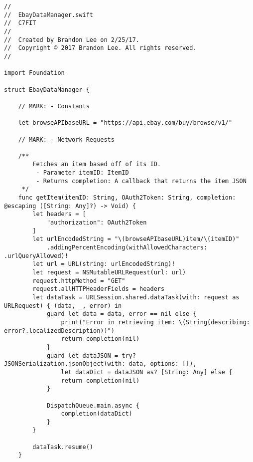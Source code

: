 \begin{verbatim}
//
//  EbayDataManager.swift
//  C7FIT
//
//  Created by Brandon Lee on 2/25/17.
//  Copyright © 2017 Brandon Lee. All rights reserved.
//

import Foundation

struct EbayDataManager {

    // MARK: - Constants

    let browseAPIbaseURL = "https://api.ebay.com/buy/browse/v1/"

    // MARK: - Network Requests

    /**
        Fetches an item based off of its ID.
         - Parameter itemID: ItemID
         - Returns completion: A callback that returns the item JSON
     */
    func getItem(itemID: String, OAuth2Token: String, completion: @escaping ([String: Any]?) -> Void) {
        let headers = [
            "authorization": OAuth2Token
        ]
        let urlEncodedString = "\(browseAPIbaseURL)item/\(itemID)"
            .addingPercentEncoding(withAllowedCharacters: .urlQueryAllowed)!
        let url = URL(string: urlEncodedString)!
        let request = NSMutableURLRequest(url: url)
        request.httpMethod = "GET"
        request.allHTTPHeaderFields = headers
        let dataTask = URLSession.shared.dataTask(with: request as URLRequest) { (data, _, error) in
            guard let data = data, error == nil else {
                print("Error in retrieving item: \(String(describing: error?.localizedDescription))")
                return completion(nil)
            }
            guard let dataJSON = try? JSONSerialization.jsonObject(with: data, options: []),
                let dataDict = dataJSON as? [String: Any] else {
                return completion(nil)
            }

            DispatchQueue.main.async {
                completion(dataDict)
            }
        }

        dataTask.resume()
    }


\end{verbatim}
